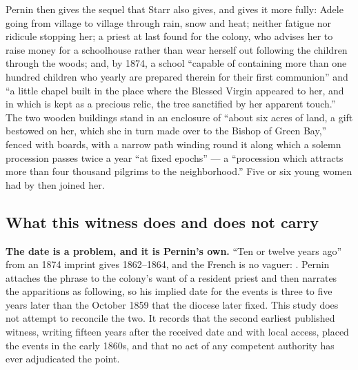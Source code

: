 Pernin then gives the sequel that Starr also gives, and gives it more
fully: Adele going from village to village through rain, snow and heat;
neither fatigue nor ridicule stopping her; a priest at last found for
the colony, who advises her to raise money for a schoolhouse rather
than wear herself out following the children through the woods; and, by
1874, a school ``capable of containing more than one hundred children
who yearly are prepared therein for their first communion'' and ``a
little chapel built in the place where the Blessed Virgin appeared to
her, and in which is kept as a precious relic, the tree sanctified by
her apparent touch.'' The two wooden buildings stand in an enclosure of
``about six acres of land, a gift bestowed on her, which she in turn
made over to the Bishop of Green Bay,'' fenced with boards, with a
narrow path winding round it along which a solemn procession passes
twice a year ``at fixed epochs'' --- a ``procession which attracts more
than four thousand pilgrims to the neighborhood.'' Five or six young
women had by then joined her.

\subsection{What this witness does and does not carry}

\textbf{The date is a problem, and it is Pernin's own.} ``Ten or twelve
years ago'' from an 1874 imprint gives 1862--1864, and the French is no
vaguer: . Pernin attaches the phrase to the
colony's want of a resident priest and then narrates the apparitions as
following, so his implied date for the events is three to five years
later than the October 1859 that the diocese later fixed. This study
does not attempt to reconcile the two. It records that the second
earliest published witness, writing fifteen years after the received
date and with local access, placed the events in the early 1860s, and
that no act of any competent authority has ever adjudicated the point.

